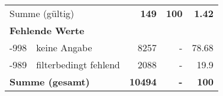 \begin{longtable}{lXrrr}
     \midrule
     \multicolumn{2}{l}{Summe (gültig)} &
       \textbf{\num{149}} &
     \textbf{\num{100}} &
       \textbf{\num[round-mode=places,round-precision=2]{1.42}} \\
     \multicolumn{5}{l}{\textbf{Fehlende Werte}}\\
       -998 &
       keine Angabe &
         \num{8257} &
        - &
         \num[round-mode=places,round-precision=2]{78.68} \\
       -989 &
       filterbedingt fehlend &
         \num{2088} &
        - &
         \num[round-mode=places,round-precision=2]{19.9} \\
     \midrule
     \multicolumn{2}{l}{\textbf{Summe (gesamt)}} &
          \textbf{\num{10494}} &
        \textbf{-} &
        \textbf{\num{100}} \\
     \bottomrule
     \end{longtable}
     
